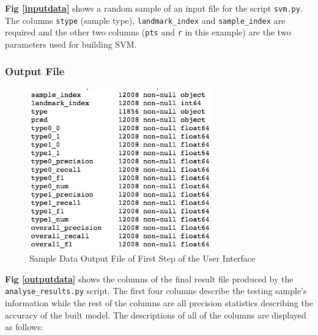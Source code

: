 \documentclass[10pt,letterpaper]{article}
\begin{document}
\textbf{Fig \ref{inputdata}} shows a random sample of an input file for
the script \texttt{svm.py}. The columns \texttt{stype} (sample type),
\texttt{landmark\_index} and \texttt{sample\_index} are required and the
other two columns (\texttt{pts} and \texttt{r} in this example) are the
two parameters used for building SVM.

\subsubsection{Output File}\label{output-file}

\begin{figure}[h]

{\centering \includegraphics[width=300px]{figures/Figure5} 

}

\caption{\label{outputdata} Sample Data Output File of First Step of the User Interface}\label{fig:unnamed-chunk-8}
\end{figure}

\textbf{Fig \ref{outputdata}} shows the columns of the final result file
produced by the \texttt{analyse\_results.py} script. The first four
columns describe the testing sample's information while the rest of the
columns are all precision statistics describing the accuracy of the
built model. The descriptions of all of the columns are displayed as
follows:
\end{document}
